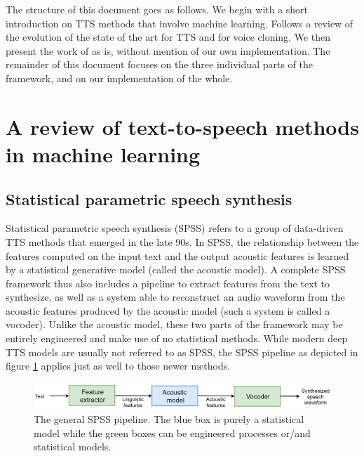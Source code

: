 \documentclass[a4paper, oneside, 12pt, english]{article}
\begin{document}
The structure of this document goes as follows. We begin with a short introduction on TTS methods that involve machine learning. Follows a review of the evolution of the state of the art for TTS and for voice cloning. We then present the work of \citep{SV2TTS} as is, without mention of our own implementation. The remainder of this document focuses on the three individual parts of the framework, and on our implementation of the whole.


\section{A review of text-to-speech methods in machine learning}
\subsection{Statistical parametric speech synthesis}
Statistical parametric speech synthesis (SPSS) refers to a group of data-driven TTS methods that emerged in the late 90s. In SPSS, the relationship between the features computed on the input text and the output acoustic features is learned by a statistical generative model (called the acoustic model). A complete SPSS framework thus also includes a pipeline to extract features from the text to synthesize, as well as a system able to reconstruct an audio waveform from the acoustic features produced by the acoustic model (such a system is called a vocoder). Unlike the acoustic model, these two parts of the framework may be entirely engineered and make use of no statistical methods. While modern deep TTS models are usually not referred to as SPSS, the SPSS pipeline as depicted in figure \ref{spss_framework} applies just as well to those newer methods.

\begin{figure}[h]
	\centering
	\includegraphics[width=\linewidth]{images/spss_framework.png}
	\caption{The general SPSS pipeline. The blue box is purely a statistical model while the green boxes can be engineered processes or/and statistical models.}
	\label{spss_framework}
\end{figure}
\end{document}
